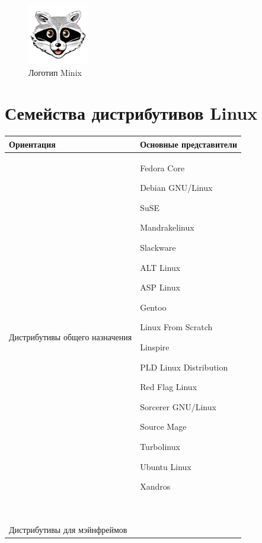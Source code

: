 \documentclass[bachelor, och, referat, times]{SCWorks}
\begin{document}
\begin{figure}[t]
    \centering
    \includegraphics[width=100px]{BVXyPwe.png}
    \caption{Логотип Minix}
    \label{fig:minix_symbol}
\end{figure}

\section{Семейства дистрибутивов Linux}

\begin{longtable}{|p{}|p{}|}
    \hline
        Ориентация & Основные представители\\\hline
        Дистрибутивы общего назначения & 
        \begin{minipage}{\textwidth}
        \begin{list}{•}{~}
            \item Fedora Core
            \item Debian GNU/Linux
            \item SuSE
            \item Mandrakelinux
            \item Slackware
            \item ALT Linux
            \item ASP Linux
            \item Gentoo
            \item Linux From Scratch
            \item Linspire
            \item PLD Linux Distribution
            \item Red Flag Linux
            \item Sorcerer GNU/Linux
            \item Source Mage
            \item Turbolinux
            \item Ubuntu Linux
            \item Xandros
        \end{list}
        ~
        \end{minipage}
    \\\hline
    \smallskip Дистрибутивы для мэйнфреймов& \begin{list}{•}{~} \item 

\end{list}
\end{longtable}
\end{document}

